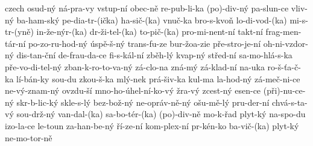\begin{hyphenrules}{czech}
{ osud-ný
 ná-pra-vy
 vstup-ní
 obec-ně
 re-pub-li-ka
 (po)-div-ný
 pa-slun-ce
 vliv-ný
 ba-ham-ský
 pe-dia-tr-(ička)
 ha-sič-(ka)
 vnuč-ka
 bro-s-kvoň
 lo-di-vod-(ka)
 mi-s-tr-(yně)
 in-že-nýr-(ka)
 dr-ži-tel-(ka)
 to-pič-(ka)
 pro-mi-nent-ní
 takt-ní
 frag-men-tár-ní
 po-zo-ru-hod-ný
 úspě-š-ný
 trans-fu-ze
 bur-žoa-zie
 pře-stro-je-ní
 oh-ni-vzdor-ný
 dis-tan-ční
 de-frau-da-ce
 fi-s-kál-ní
 zběh-lý
 kvap-ný
 střed-ní
 sa-mo-hlá-s-ka
 pře-vo-di-tel-ný
 zban-k-ro-to-va-ný
 zá-clo-na
 zná-mý
 zá-klad-ní
 na-uka
 ro-š-ťa-č-ka
 lí-bán-ky
 sou-du
 zkou-š-ka
 mlý-nek
 prá-šiv-ka
 kul-ma
 la-hod-ný
 zá-meč-ni-ce
 ne-vý-znam-ný
 ovzdu-ší
 mno-ho-úhel-ní-ko-vý
 žra-vý
 zcest-ný
 esen-ce
 (při)-nu-ce-ný
 skr-b-lic-ký
 skle-s-lý
 bez-bož-ný
 ne-opráv-ně-ný
 ošu-mě-lý
 pru-der-ní
 chvá-s-ta-vý
 sou-drž-ný
 van-dal-(ka)
 sa-bo-tér-(ka)
 (po)-div-ně
 mo-k-řad
 plyt-ký
 na-spo-du
 izo-la-ce
 le-toun
 za-han-be-ný
 ří-ze-ní
 kom-plex-ní
 pr-kén-ko
 ba-vič-(ka)
 plyt-ký
 ne-mo-tor-ně
  }
\end{hyphenrules}
